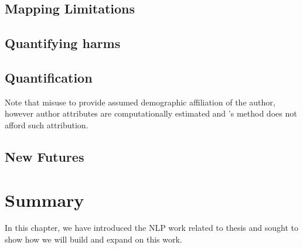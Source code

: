 \subsection{Mapping Limitations}

\cite{Mitchell:2019}
\cite{Bender-Friedman:2018}
\cite{Hovy-Spruit:2016}
\cite{Blodget:2020}
\cite{Holstein:2019}

\subsection{Quantifying harms}
\cite{Buolamwini:2018}
\cite{Kulynych:2020}
\cite{Shah:2020}
\cite{Vanmassenhove:2018}
\cite{Waseem:2016}
\cite{Derzynski:2016}
\cite{Birhane:2020}

\subsection{Quantification}
\cite{Agarwal:2018}
\cite{Romanov:2019}
Note that \cite{Sap:2019} misuse \cite{Blodgett:2016} to provide assumed demographic affiliation of the author, however author attributes are computationally estimated and \cite{Blodgett:2016}'s method does not afford such attribution.
\cite{Davidson:2019}
\cite{Zhao:2017}

\subsection{New Futures}

\cite{Yimam-Biemann:2018}
\cite{Bingel:2018}
\cite{Kalluri:2019}

\section{Summary}
In this chapter, we have introduced the NLP work related to thesis and sought to show how we will build and expand on this work.
